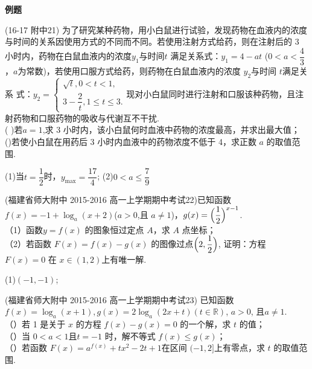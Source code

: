 \begin{exercise}{\large \bf 例\hspace{0.6em}题}
    \item%
      (16-17 附中21) 为了研究某种药物，用小白鼠进行试验，发现药物在血液内的浓度与时间的关系因使用方式的不同而不同。若使用注射方式给药，则在注射后的 3 小时内，药物在白鼠血液内的浓度$y_1$与时间$t$ 满足关系式：$y_1 =4-at$ ($0<a<\dfrac{4}{3}$，$a$为常数)，若使用口服方式给药，则药物在白鼠血液内的浓度 $y_2$与时间 $t$满足关系 式：$y_2=\begin{cases}\sqrt{t},0<t<1,\\3-\dfrac{2}{t},1\leq t\leq3.\end{cases}$现对小白鼠同时进行注射和口服该种药物，且注射药物和口服药物的吸收与代谢互不干扰.\\
      ( )若$a=1$,求 3 小时内，该小白鼠何时血液中药物的浓度最高，并求出最大值；\\
      ()若使小白鼠在用药后 3 小时内血液中的药物浓度不低于 4，求正数 $a$ 的取值范围.\\
      \begin{answer}
        (1)当$t=\dfrac12$时，$y_{\max}=\dfrac{17}{4}$;
        (2)$0<a\leq\dfrac{7}{9}$
      \end{answer}
    \vspace{20em}
    \item%
       (福建省师大附中 2015-2016 高一上学期期中考试22)已知函数$f(x)=-1+\log_a{(x+2)}$($a>0$,且 $a \neq1$)，$g(x)=\Bigl(\dfrac12\Bigr)^{x-1}$.\\
      （1）函数$ y= f (x )$ 的图象恒过定点 $A$，求 $A$ 点坐标；\\
      （2）若函数 $F ( x )= f ( x )- g ( x )$ 的图像过点$\Bigl(2,\dfrac12\Bigr)$, 证明：方程 $F ( x )= 0$ 在 $x\in(1,2)$上有唯一解.
      \begin{answer}
      (1)$(-1,-1)$;
      \end{answer}
    \vspace{20em}
    \item%
       (福建省师大附中 2015-2016 高一上学期期中考试23) 已知函数 $f ( x ) =\log_a ( x+ 1), g ( x )= 2 \log_a ( 2 x+ t )(t\in \mathbb{R})$, $a> 0$, 且$a\neq 1$.\\
      （）若 1 是关于 $x$ 的方程 $f ( x) -g ( x) =0$ 的一个解，求 $t$ 的值；\\
      （）当 $0< a< 1$且$t=-1$ 时，解不等式 $f ( x)\leq g ( x) $；\\
      （）若函数 $F ( x)= a^{f ( x ) }+ tx^2- 2t+ 1 $在区间 $(-1,2]$上有零点，求 $t$ 的取值范围.

\end{exercise}
